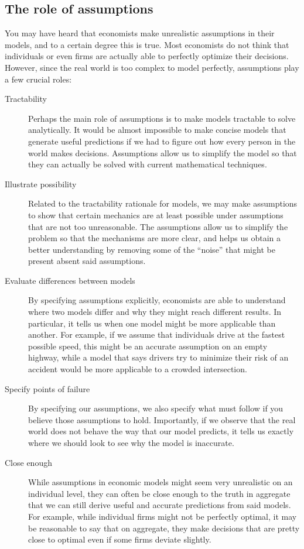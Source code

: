 \subsection*{The role of assumptions}
You may have heard that economists make unrealistic assumptions in their models, and to a certain degree this is true. Most economists do not think that individuals or even firms are actually able to perfectly optimize their decisions. However, since the real world is too complex to model perfectly, assumptions play a few crucial roles: 
\begin{description}
    \item[Tractability] Perhaps the main role of assumptions is to make models tractable to solve analytically. It would be almost impossible to make concise models that generate useful predictions if we had to figure out how every person in the world makes decisions. Assumptions allow us to simplify the model so that they can actually be solved with current mathematical techniques.
    \item[Illustrate possibility] Related to the tractability rationale for models, we may make assumptions to show that certain mechanics are at least possible under assumptions that are not too unreasonable. The assumptions allow us to simplify the problem so that the mechanisms are more clear, and helps us obtain a better understanding by removing some of the ``noise'' that might be present absent said assumptions. 
    \item[Evaluate differences between models] By specifying assumptions explicitly, economists are able to understand where two models differ and why they might reach different results. In particular, it tells us when one model might be more applicable than another. For example, if we assume that individuals drive at the fastest possible speed, this might be an accurate assumption on an empty highway, while a model that says drivers try to minimize their risk of an accident would be more applicable to a crowded intersection.
    \item[Specify points of failure] By specifying our assumptions, we also specify what must follow if you believe those assumptions to hold. Importantly, if we observe that the real world does not behave the way that our model predicts, it tells us exactly where we should look to see why the model is inaccurate.
    \item[Close enough] While assumptions in economic models might seem very unrealistic on an individual level, they can often be close enough to the truth in aggregate that we can still derive useful and accurate predictions from said models. For example, while individual firms might not be perfectly optimal, it may be reasonable to say that on aggregate, they make decisions that are pretty close to optimal even if some firms deviate slightly. 
\end{description}
